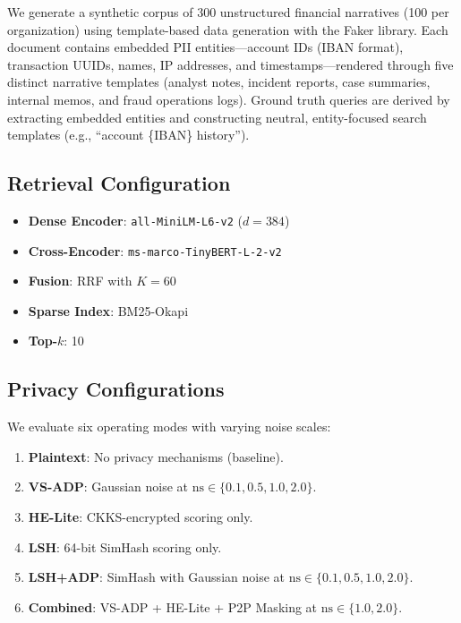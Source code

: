 \documentclass[conference]{IEEEtran}
\begin{document}
We generate a synthetic corpus of 300 unstructured financial narratives (100 per organization) using template-based data generation with the Faker library. Each document contains embedded PII entities---account IDs (IBAN format), transaction UUIDs, names, IP addresses, and timestamps---rendered through five distinct narrative templates (analyst notes, incident reports, case summaries, internal memos, and fraud operations logs). Ground truth queries are derived by extracting embedded entities and constructing neutral, entity-focused search templates (e.g., ``account \{IBAN\} history'').

\subsection{Retrieval Configuration}

\begin{itemize}
    \item \textbf{Dense Encoder}: \texttt{all-MiniLM-L6-v2} ($d=384$)
    \item \textbf{Cross-Encoder}: \texttt{ms-marco-TinyBERT-L-2-v2}
    \item \textbf{Fusion}: RRF with $K=60$
    \item \textbf{Sparse Index}: BM25-Okapi
    \item \textbf{Top-$k$}: 10
\end{itemize}

\subsection{Privacy Configurations}

We evaluate six operating modes with varying noise scales:

\begin{enumerate}
    \item \textbf{Plaintext}: No privacy mechanisms (baseline).
    \item \textbf{VS-ADP}: Gaussian noise at $\text{ns} \in \{0.1, 0.5, 1.0, 2.0\}$.
    \item \textbf{HE-Lite}: CKKS-encrypted scoring only.
    \item \textbf{LSH}: 64-bit SimHash scoring only.
    \item \textbf{LSH+ADP}: SimHash with Gaussian noise at $\text{ns} \in \{0.1, 0.5, 1.0, 2.0\}$.
    \item \textbf{Combined}: VS-ADP + HE-Lite + P2P Masking at $\text{ns} \in \{1.0, 2.0\}$.
\end{enumerate}
\end{document}
